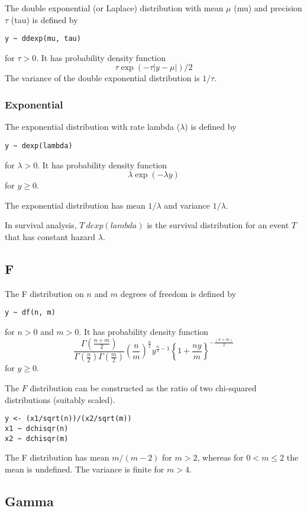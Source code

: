 \documentclass[11pt, a4paper, titlepage]{report}
\begin{document}
The double exponential (or Laplace) distribution with mean $\mu$ (mu) and
precision $\tau$ (tau) is defined by
\begin{verbatim}
y ~ ddexp(mu, tau)
\end{verbatim}
for $\tau > 0$. It has probability density function
\[
\tau \exp(-\tau | y - \mu |)/2
\]
The variance of the double exponential distribution is $1/\tau$.

\subsubsection{Exponential}
\label{bugs:dexp}

The exponential distribution with rate lambda ($\lambda$) is defined by
\begin{verbatim}
y ~ dexp(lambda)
\end{verbatim}
for $\lambda > 0$. It has probability density function
\[
\lambda \exp(-\lambda y)
\]
for $y \geq 0$.

The exponential distribution has mean $1/\lambda$ and variance $1/\lambda$.

In survival analysis, $T ~ dexp(lambda)$ is the survival distribution
for an event $T$ that has constant hazard $\lambda$.

\subsection{F}
\label{bugs:df}

The F distribution on $n$ and $m$ degrees of freedom is defined by
\begin{verbatim}
y ~ df(n, m)
\end{verbatim}
for $n > 0$ and $m > 0$. It has probability density function
\[
\frac{\Gamma(\frac{n + m}{2})}
     {\Gamma(\frac{n}{2}) \Gamma(\frac{m}{2})}
     \left(\frac{n}{m} \right)^{\frac{n}{2}} y^{\frac{n}{2} - 1} 
     \left\{1 + \frac{ny}{m} \right\}^{-\frac{(n + m)}{2}}
\]
for $y \geq 0$.       

The $F$ distribution can be constructed as the ratio of two chi-squared
distributions (suitably scaled).
\begin{verbatim}
y <- (x1/sqrt(n))/(x2/sqrt(m))
x1 ~ dchisqr(n)
x2 ~ dchisqr(m)
\end{verbatim}
The F distribution has mean $m/(m-2)$ for $m > 2$, whereas for $0 < m \leq 2$
the mean is undefined. The variance is finite for $m > 4$.

\subsection{Gamma}
\end{document}

